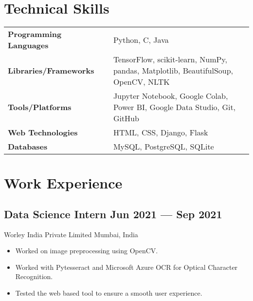 \documentclass[10pt]{article}
\newcommand{\subtext}[1]{
#1\par\vspace{-0.2cm}}
\newenvironment{zitemize}{
\begin{itemize}\itemsep2pt \parskip0pt \parsep1pt}
{\end{itemize}\vspace{-0.7cm}}
\newcommand{\hskills}[1]{
\textbf{\bfseries #1} }
\begin{document}
\section{Technical Skills}
\begin{tabular}{p{11em} p{1em} p{43em}}
\hskills{Programming Languages }&  &  Python, C, Java \\
\hskills{Libraries/Frameworks} &  & TensorFlow, scikit-learn, NumPy, pandas, Matplotlib, BeautifulSoup, OpenCV, NLTK \\
\hskills{Tools/Platforms} &  & Jupyter Notebook, Google Colab, Power BI, Google Data Studio, Git, GitHub \\
\hskills{Web Technologies} &  & HTML, CSS, Django, Flask \\
\hskills{Databases} &  & MySQL, PostgreSQL, SQLite \\

\end{tabular}
\vspace{-0.4cm}

\section{Work Experience}

\subsection*{Data Science Intern \hfill Jun 2021 --- Sep 2021} 
\subtext{Worley India Private Limited \hfill Mumbai, India} 
    \begin{zitemize}
        \item Worked on image preprocessing using OpenCV.
        \item Worked with Pytesseract and Microsoft Azure OCR for Optical Character Recognition.
        \item Tested the web based tool to ensure a smooth user experience.
    \end{zitemize}
\vspace{-0.2cm}





\end{document}
